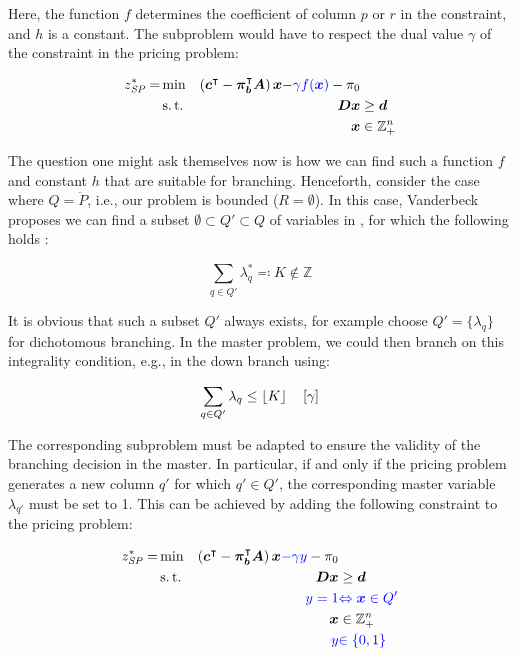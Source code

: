 Here, the function $f$ determines the coefficient of column $p$ or $r$ in the constraint, and $h$ is a constant. The subproblem would have to respect the dual value $\gamma$ of the constraint in the pricing problem:

\begin{equation*}
\begin{aligned}
z^*_\SP{} = &\min & \left( \vec{c}\transpose - \vec{\pi}_\vec{b}\transpose \mat{A} \right) \vec{x} {\color{blue} - \gamma f(\vec{x})} - \pi_0 & \\
&\st & \mat{D} \vec{x} & \geq \vec{d} \\
&& \vec{x} & \in \mathbb{Z}_+^n
\end{aligned}
\end{equation*}

The question one might ask themselves now is how we can find such a function $f$ and constant $h$ that are suitable for branching. Henceforth, consider the case where $Q = \ddot{P}$, i.e., our problem is bounded ($R = \emptyset$). In this case, Vanderbeck proposes we can find a subset $\emptyset \subset Q' \subset Q$ of variables in \RMP{}, for which the following holds \cite{vanderbeck1996exact}:

\begin{equation}
\sum_{q \in Q'} \lambda_q^* \eqqcolon K \not\in \mathbb{Z}
\end{equation}

It is obvious that such a subset $Q'$ always exists, for example choose $Q' = \{\lambda_q\}$ for dichotomous branching. In the master problem, we could then branch on this integrality condition, e.g., in the down branch using:

\begin{equation}
\sum_{q \in Q'} \lambda_q \leq \lfloor K\rfloor \quad \left[\gamma\right]
\end{equation}

The corresponding subproblem must be adapted to ensure the validity of the branching decision in the master. In particular, if and only if the pricing problem generates a new column $q'$ for which $q' \in Q'$, the corresponding master variable $\lambda_{q'}$ must be set to 1. This can be achieved by adding the following constraint to the pricing problem:

\begin{equation}\label{eq:cg_bp_branchmaster_pricingmod}
\begin{aligned}
z^*_\SP{} = &\min & \left( \vec{c}\transpose - \vec{\pi}_\vec{b}\transpose \mat{A} \right) \vec{x} {\color{blue} - \gamma y} - \pi_0 & \\
&\st & \mat{D} \vec{x} & \geq \vec{d} \\
&& {\color{blue} y = 1} & {\color{blue} \Leftrightarrow \vec{x} \in Q'} \\
&& \vec{x} & \in \mathbb{Z}_+^n \\
&& {\color{blue} y} & {\color{blue} \in \{0, 1\}}
\end{aligned}
\end{equation}

